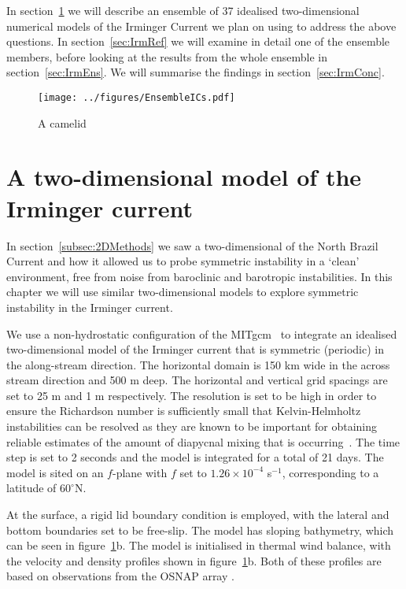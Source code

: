 In section~\ref{sec:Irm2DMeth} we will describe an ensemble of 37 idealised two-dimensional numerical models of the Irminger Current we plan on using to address the above questions. In section~\ref{sec:IrmRef} we will examine in detail one of the ensemble members, before looking at the results from the whole ensemble in section~\ref{sec:IrmEns}. We will summarise the findings in section~\ref{sec:IrmConc}.

\begin{figure} 
    \centering
    \texttt{[image: ../figures/EnsembleICs.pdf]}
    \caption{A camelid}
    \label{fig:EnsembleICs}
\end{figure}

\section{A two-dimensional model of the Irminger current}
\label{sec:Irm2DMeth}
In section~\ref{subsec:2DMethods} we saw a two-dimensional of the North Brazil Current and how it allowed us to probe symmetric instability in a `clean' environment, free from noise from baroclinic and barotropic instabilities. In this chapter we will use similar two-dimensional models to explore symmetric instability in the Irminger current.

We use a non-hydrostatic configuration of the MITgcm~\citep{Marshall1997} to integrate an idealised two-dimensional model of the Irminger current that is symmetric (periodic) in the along-stream direction. The horizontal domain is 150 km wide in the across stream direction and 500 m deep. The horizontal and vertical grid spacings are set to 25 m and 1 m respectively. The resolution is set to be high in order to ensure the Richardson number is sufficiently small that Kelvin-Helmholtz instabilities can be resolved as they are known to be important for obtaining reliable estimates of the amount of diapycnal mixing that is occurring~\citep{Griffiths2003a, Yankovsky2019}. The time step is set to 2 seconds and the model is integrated for a total of 21 days. The model is sited on an $f$-plane with $f$ set to $1.26 \times 10^{-4}$ s$^{-1}$, corresponding to a latitude of $60^\circ$N. 

At the surface, a rigid lid boundary condition is employed, with the lateral and bottom boundaries set to be free-slip. The model has sloping bathymetry, which can be seen in  figure~\ref{fig:EnsembleICs}b. The model is initialised in thermal wind balance, with the velocity and density profiles shown in figure~\ref{fig:EnsembleICs}b. Both of these profiles are based on observations from the OSNAP array \citet{LeBras2022}.

